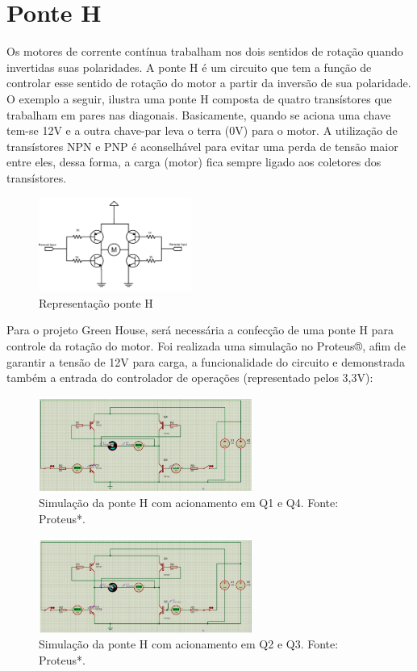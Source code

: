 \section{Ponte H}
Os motores de corrente contínua trabalham nos dois sentidos de rotação quando invertidas suas polaridades. A ponte H é um circuito que tem a função de controlar esse sentido de rotação do motor a partir da inversão de sua polaridade. O exemplo a seguir, ilustra uma ponte H composta de quatro transístores que trabalham em pares nas diagonais. Basicamente, quando se aciona uma chave tem-se 12V e a outra chave-par leva o terra (0V) para o motor. A utilização de transístores NPN e PNP é aconselhável para evitar uma perda de tensão maior entre eles, dessa forma, a carga (motor) fica sempre ligado aos coletores dos transístores.     

\begin{figure}[H]
	\centering
	\includegraphics[width=5cm]{figuras/ponteH.png}
	\caption{Representação ponte H}
	\label{ponte H}
\end{figure}

Para o projeto Green House, será necessária a confecção de uma ponte H para controle da rotação do motor. Foi realizada uma simulação no Proteus®, afim de garantir a tensão de 12V para carga, a funcionalidade do circuito e demonstrada também a entrada do controlador de operações (representado pelos 3,3V):

\begin{figure}[H]
	\centering
	\includegraphics[width=7cm]{figuras/simulacaoPonteH.png}
	\caption{Simulação da ponte H com acionamento em Q1 e Q4. Fonte: Proteus*.}
	\label{simulação ponte H}
\end{figure}

\begin{figure}[H]
	\centering
	\includegraphics[width=7cm]{figuras/simulacaoPonteH2.png}
	\caption{Simulação da ponte H com acionamento em Q2 e Q3. Fonte: Proteus*.}
	\label{simulação ponte H 2}
\end{figure}

